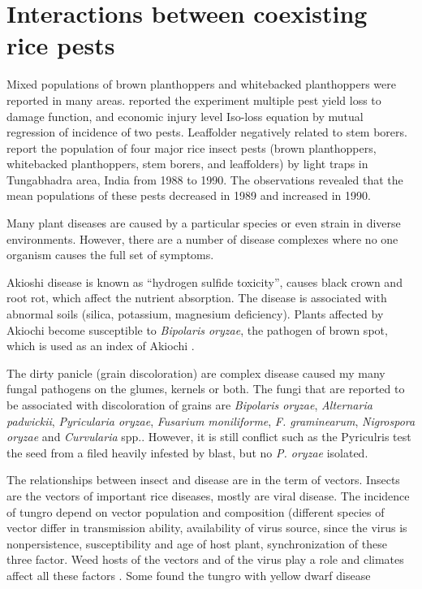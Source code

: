 \documentclass[12pt, oneside]{report}
\begin{document}
\section*{Interactions between coexisting rice pests}

Mixed populations of brown planthoppers and whitebacked planthoppers were reported in many areas. \cite{naganagoud2010studies} reported the experiment multiple pest yield loss to damage function, and economic injury level Iso-loss equation by mutual regression of incidence of two pests. Leaffolder negatively related to stem borers. \cite{selvaraj2012determination} report the population of four major rice insect pests (brown planthoppers, whitebacked planthoppers, stem borers, and leaffolders) by light traps in Tungabhadra area, India from 1988 to 1990. The observations revealed that the mean populations of these pests decreased in 1989 and increased in 1990.

Many plant diseases are caused by a particular species or even strain in diverse environments. However, there are a number of disease complexes where no one organism causes the full set of symptoms.

Akioshi disease is known as ``hydrogen sulfide toxicity'', causes black crown and root rot, which affect the nutrient absorption. The disease is associated with abnormal soils (silica, potassium, magnesium deficiency). Plants affected by Akiochi become susceptible to \textit{Bipolaris oryzae}, the pathogen of brown spot, which is used as an index of Akiochi \citep{ouricedisease}.


The dirty panicle (grain discoloration) are complex disease caused my many fungal pathogens on the glumes, kernels or both. The fungi that are reported to be associated with discoloration of grains are \textit{Bipolaris oryzae}, \textit{Alternaria padwickii}, \textit{Pyricularia oryzae}, \textit{Fusarium moniliforme}, \textit{F. graminearum}, \textit{Nigrospora oryzae} and \textit{Curvularia} spp.\cite{ouricedisease}. However, it is still conflict such as the Pyriculris test the seed from a filed heavily infested by blast, but no \textit{P. oryzae} isolated.

The relationships between insect and disease are in the term of vectors. Insects are the vectors of important rice diseases, mostly are viral disease. The incidence of tungro depend on vector population and composition (different species of vector differ in transmission ability, availability of virus source, since the virus is nonpersistence, susceptibility and age of host plant, synchronization of these three factor. Weed hosts of the vectors and of the virus play a role and climates affect all these factors \cite{naganagoud2010studies}. Some found the tungro with yellow dwarf disease \cite{ouricedisease}
\end{document}
